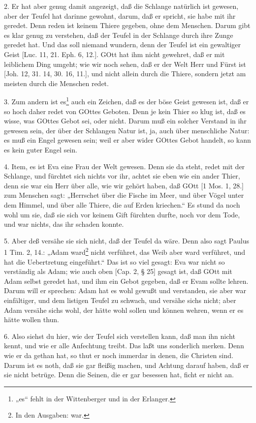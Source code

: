2. Er hat aber genug damit angezeigt, daß die Schlange natürlich ist gewesen, aber der Teufel hat darinne gewohnt, darum, daß er spricht, sie habe mit ihr geredet. Denn reden ist keinem Thiere gegeben, ohne dem Menschen. Darum gibt es klar genug zu verstehen, daß der Teufel in der Schlange durch ihre Zunge geredet hat. Und das soll niemand wundern, denn der Teufel ist ein gewaltiger Geist [Luc. 11, 21. Eph. 6, 12.]. GOtt hat ihm nicht gewehret, daß er mit leiblichem Ding umgeht; wie wir noch sehen, daß er der Welt Herr und Fürst ist [Joh. 12, 31. 14, 30. 16, 11.], und nicht allein durch die Thiere, sondern jetzt am meisten durch die Menschen redet.

3. Zum andern ist es\footnote{„es“ fehlt in der Wittenberger und in der Erlanger.} auch ein Zeichen, daß es der böse Geist gewesen ist, daß er so hoch daher redet von GOttes Geboten. Denn je kein Thier so klug ist, daß es wisse, was GOttes Gebot sei, oder nicht. Darum muß ein solcher Verstand in ihr gewesen sein, der über der Schlangen Natur ist, ja, auch über menschliche Natur: es muß ein Engel gewesen sein; weil er aber wider GOttes Gebot handelt, so kann es kein guter Engel sein.

4. Item, es ist Eva eine Frau der Welt gewesen. Denn sie da steht, redet mit der Schlange, und fürchtet sich nichts vor ihr, achtet sie eben wie ein ander Thier, denn sie war ein Herr über alle, wie wir gehört haben, daß GOtt [1 Mos. 1, 28.] zum Menschen sagt: „Herrschet über die Fische im Meer, und über Vögel unter dem Himmel, und über alle Thiere, die auf Erden kriechen.“ Es stund da noch wohl um sie, daß sie sich vor keinem Gift fürchten durfte, noch vor dem Tode, und war nichts, das ihr schaden konnte.

5. Aber deß versähe sie sich nicht, daß der Teufel da wäre. Denn also sagt Paulus 1 Tim. 2, 14.: „Adam ward\footnote{In den Ausgaben: war.} nicht verführet, das Weib aber ward verführet, und hat die Uebertretung eingeführt.“ Das ist so viel gesagt: Eva war nicht so verständig als Adam; wie auch oben [Cap. 2, § 25] gesagt ist, daß GOtt mit Adam selbst geredet hat, und ihm ein Gebot gegeben, daß er Evam sollte lehren. Darum will er sprechen: Adam hat es wohl gewußt und verstanden, sie aber war einfältiger, und dem listigen Teufel zu schwach, und versähe sichs nicht; aber Adam versähe sichs wohl, der hätte wohl sollen und können wehren, wenn er es hätte wollen thun.

6. Also siehst du hier, wie der Teufel sich verstellen kann, daß man ihn nicht kennt, und wie er alle Anfechtung treibt. Das laßt uns sonderlich merken. Denn wie er da gethan hat, so thut er noch immerdar in denen, die Christen sind. Darum ist es noth, daß sie gar fleißig machen, und Achtung darauf haben, daß er sie nicht betrüge. Denn die Seinen, die er gar besessen hat, ficht er nicht an.

